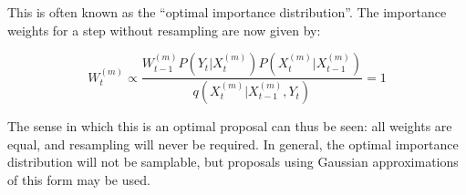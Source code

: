 This is often known as the ``optimal importance distribution''. The importance weights for a step without resampling are now given by:

\begin{equation}
W_t^{(m)} \propto \frac{ W_{t-1}^{(m)} P(Y_t|X_t^{(m)})P(X_t^{(m)}|X_{t-1}^{(m)})}{q(X_t^{(m)}|X_{t-1}^{(m)}, Y_t)} = 1
\label{eq:OptimalImportanceWeights}
\end{equation}

The sense in which this is an optimal proposal can thus be seen: all weights are equal, and resampling will never be required. In general, the optimal importance distribution will not be samplable, but proposals using Gaussian approximations of this form may be used.